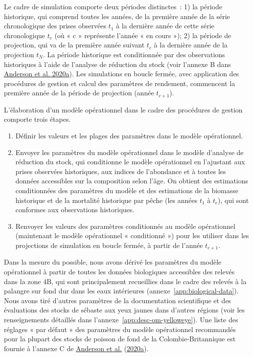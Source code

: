 \documentclass[11pt]{book}
\begin{document}
Le cadre de simulation comporte deux périodes distinctes~: 1) la période historique, qui comprend toutes les années, de la première année de la série chronologique des prises observées \(t_1\) à la dernière année de cette série chronologique \(t_c\) (où « c » représente l'année « en cours »); 2) la période de projection, qui va de la première année suivant \(t_c\) à la dernière année de la projection \(t_N\). La période historique est conditionnée par des observations historiques à l'aide de l'analyse de réduction du stock (voir l'annexe B dans \protect\hyperlink{ref-anderson2020gfmp}{Anderson et al. 2020a}). Les simulations en boucle fermée, avec application des procédures de gestion et calcul des paramètres de rendement, commencent la première année de la période de projection (année \(t_{c+1}\)).

L'élaboration d'un modèle opérationnel dans le cadre des procédures de gestion comporte trois étapes.
\begin{enumerate}
\def\labelenumi{\arabic{enumi}.}
\item
  Définir les valeurs et les plages des paramètres dans le modèle opérationnel.
\item
  Envoyer les paramètres du modèle opérationnel dans le modèle d'analyse de réduction du stock, qui conditionne le modèle opérationnel en l'ajustant aux prises observées historiques, aux indices de l'abondance et à toutes les données accessibles sur la composition selon l'âge. On obtient des estimations conditionnées des paramètres du modèle et des estimations de la biomasse historique et de la mortalité historique par pêche (les années \(t_1\) à \(t_c\)), qui sont conformes aux observations historiques.
\item
  Renvoyer les valeurs des paramètres conditionnés au modèle opérationnel (maintenant le modèle opérationnel « conditionné ») pour les utiliser dans les projections de simulation en boucle fermée, à partir de l'année \(t_{c+1}\).
\end{enumerate}
Dans la mesure du possible, nous avons dérivé les paramètres du modèle opérationnel à partir de toutes les données biologiques accessibles des relevés dans la zone 4B, qui sont principalement recueillies dans le cadre des relevés à la palangre sur fond dur dans les eaux intérieures (annexe~\ref{app:biological-data}). Nous avons tiré d'autres paramètres de la documentation scientifique et des évaluations des stocks de sébaste aux yeux jaunes dans d'autres régions (voir les renseignements détaillés dans l'annexe~\ref{app:desc-om-yelloweye}). Une liste des réglages « par défaut » des paramètres du modèle opérationnel recommandés pour la plupart des stocks de poisson de fond de la Colombie-Britannique est fournie à l'annexe C de \protect\hyperlink{ref-anderson2020gfmp}{Anderson et al.} (\protect\hyperlink{ref-anderson2020gfmp}{2020a}).
\end{document}

